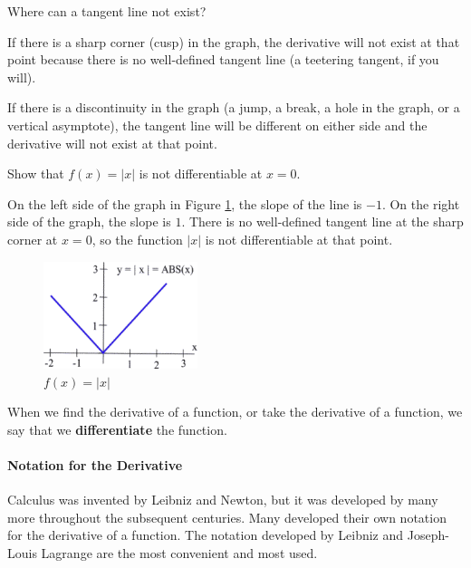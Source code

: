 Where can a tangent line not exist?

If there is a sharp corner (cusp) in the graph, the derivative will not exist at that point because there is no well-defined tangent line (a teetering tangent, if you will).

If there is a discontinuity in the graph (a jump, a break, a hole in the graph, or a vertical asymptote), the tangent line will be different on either side and the derivative will not exist at that point.

\begin{example}
Show that $f(x)=|x|$ is not differentiable at $x=0$.

\begin{solution} On the left side of the graph in Figure \ref{fig:2-3-absx}, the slope of the line is $-1$. On the right side of the graph, the slope is $1$. There is no well-defined tangent line at the sharp corner at $x=0$, so the function $|x|$ is not differentiable at that point.

\begin{figure}[!ht]
  \centering
    \includegraphics[width=0.4\textwidth]{img/chap2/image038.png}
    \caption{$f(x)=|x|$}
    \label{fig:2-3-absx}
\end{figure}
\end{solution}\end{example}


\begin{definition}
When we find the derivative of a function, or take the derivative of a function, we say that we {\bf differentiate} the function.
\end{definition}

\paragraph*{Notation for the Derivative}
Calculus was invented by Leibniz and Newton, but it was developed by many more throughout the subsequent centuries. Many developed their own notation for the derivative of a function. The notation developed by Leibniz and Joseph-Louis Lagrange are the most convenient and most used. 

